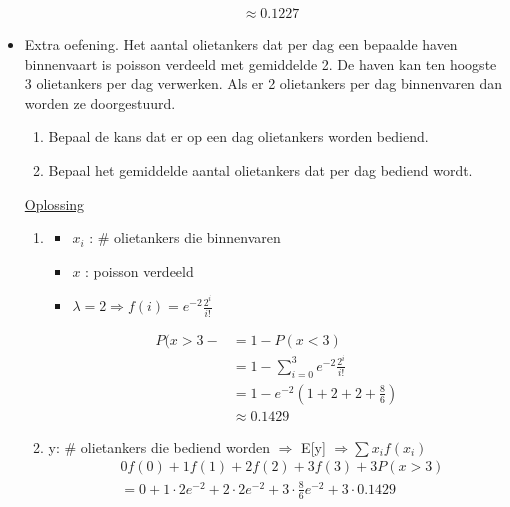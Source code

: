 \documentclass[12pt]{report}
\newcommand{\exercise}[2]{
  #1
  

  \underline{Oplossing}
  
  #2
  
    \hrulefill
}
\begin{document}
\begin{itemize}[label={}]
{{\begin{enumerate}
\begin{equation*}
\begin{split}
                            &\approx 0.1227
            \end{split}
          \end{equation*}  
    \end{enumerate}
 }}
 \item {
    \exercise{
        Extra oefening.         
        Het aantal olietankers dat per dag een bepaalde haven binnenvaart is poisson verdeeld met gemiddelde 2. De haven kan ten hoogste 3 olietankers per dag verwerken. Als er 2 olietankers per dag binnenvaren dan worden ze doorgestuurd.
            \begin{enumerate}
             \item Bepaal de kans dat er op een dag olietankers worden bediend.
             \item Bepaal het gemiddelde aantal olietankers dat per dag bediend wordt.
            \end{enumerate}
    }{
        \begin{enumerate}
         \item \begin{itemize}
                    \item $x_i$ : \# olietankers die binnenvaren 
                    \item $x$   : poisson verdeeld
                    \item $\lambda = 2 \Rightarrow f(i) = e^{-2}\frac{2^i}{i!}$
                \end{itemize}
                \begin{equation*}
                 \begin{split}
                  P(x > 3- & = 1 - P(x < 3) \\
                            & = 1 - \sum_{i = 0}^{3}e^{-2}\frac{2^i}{i!} \\
                            & = 1 - e^{-2}(1 + 2 + 2 + \frac{8}{6}) \\
                            & \approx 0.1429
                 \end{split}
                \end{equation*}
        \item y: \# olietankers die bediend worden $\Rightarrow$ E[y] $\Rightarrow \sum x_if(x_i)$
            \begin{equation*}
             \begin{split}
              & 0f(0) + 1f(1) + 2f(2) + 3f(3) + 3P(x > 3) \\
              & = 0 + 1\cdot 2e^{-2} + 2\cdot 2e^{-2}+ 3\cdot \frac{8}{6}e^{-2} + 3\cdot 0.1429\\

\end{split}
\end{equation*}
\end{enumerate}}}
\end{itemize}
\end{document}
